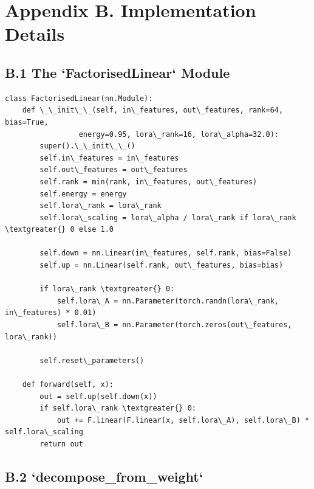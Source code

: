 
\section{Appendix B. Implementation Details}

\subsection{B.1 The `FactorisedLinear` Module}

\begin{lstlisting}
class FactorisedLinear(nn.Module):
    def \_\_init\_\_(self, in\_features, out\_features, rank=64, bias=True,
                 energy=0.95, lora\_rank=16, lora\_alpha=32.0):
        super().\_\_init\_\_()
        self.in\_features = in\_features
        self.out\_features = out\_features
        self.rank = min(rank, in\_features, out\_features)
        self.energy = energy
        self.lora\_rank = lora\_rank
        self.lora\_scaling = lora\_alpha / lora\_rank if lora\_rank \textgreater{} 0 else 1.0
        
        self.down = nn.Linear(in\_features, self.rank, bias=False)
        self.up = nn.Linear(self.rank, out\_features, bias=bias)
        
        if lora\_rank \textgreater{} 0:
            self.lora\_A = nn.Parameter(torch.randn(lora\_rank, in\_features) * 0.01)
            self.lora\_B = nn.Parameter(torch.zeros(out\_features, lora\_rank))
        
        self.reset\_parameters()
    
    def forward(self, x):
        out = self.up(self.down(x))
        if self.lora\_rank \textgreater{} 0:
            out += F.linear(F.linear(x, self.lora\_A), self.lora\_B) * self.lora\_scaling
        return out
\end{lstlisting}

\subsection{B.2 `decompose\_from\_weight`}

